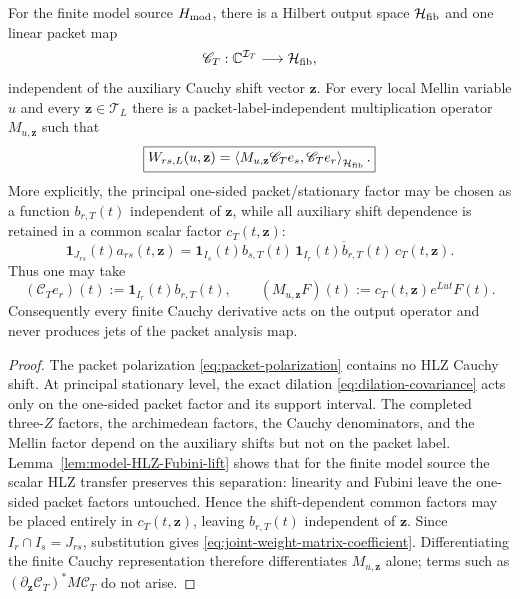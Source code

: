 \begin{lemma}
\label{lem:joint-weight-common-factor}
For the finite model source $H_{\rm mod}$, there is a Hilbert output space
$\mathcal H_{\rm fib}$ and one linear packet map
\[
\mathscr C_T:\mathbb C^{\mathcal I_T}\longrightarrow\mathcal H_{\rm fib},
\]
independent of the auxiliary Cauchy shift vector $\mathbf z$.  For every local
Mellin variable $u$ and every $\mathbf z\in\mathcal T_L$ there is a
packet-label-independent multiplication operator $M_{u,\mathbf z}$ such that
\begin{equation}
\boxed{
W_{rs,L}(u,\mathbf z)
=\left\langle
M_{u,\mathbf z}\mathscr C_Te_s,
\mathscr C_Te_r
\right\rangle_{\mathcal H_{\rm fib}}.
}
\label{eq:joint-weight-matrix-coefficient}
\end{equation}
More explicitly, the principal one-sided packet/stationary factor may be chosen
as a function $b_{r,T}(t)$ independent of $\mathbf z$, while all auxiliary
shift dependence is retained in a common scalar factor $c_T(t,\mathbf z)$:
\[
\mathbf 1_{J_{rs}}(t)a_{rs}(t,\mathbf z)
=
\mathbf 1_{I_s}(t)b_{s,T}(t)\,
\overline{\mathbf 1_{I_r}(t)b_{r,T}(t)}\,
c_T(t,\mathbf z).
\]
Thus one may take
\[
(\mathscr C_Te_r)(t):=\mathbf 1_{I_r}(t)b_{r,T}(t),
\qquad
(M_{u,\mathbf z}F)(t):=c_T(t,\mathbf z)e^{Lut}F(t).
\]
Consequently every finite Cauchy derivative acts on the output operator and
never produces jets of the packet analysis map.
\end{lemma}

\begin{proof}
The packet polarization \eqref{eq:packet-polarization} contains no HLZ Cauchy
shift.  At principal stationary level, the exact dilation
\eqref{eq:dilation-covariance} acts only on the one-sided packet factor and its
support interval.  The completed three-$Z$ factors, the archimedean factors,
the Cauchy denominators, and the Mellin factor depend on the auxiliary shifts
but not on the packet label. Lemma~\ref{lem:model-HLZ-Fubini-lift} shows that
for the finite model source the scalar HLZ transfer preserves this separation:
linearity and Fubini leave the one-sided packet factors untouched. Hence the
shift-dependent common factors may be placed entirely in $c_T(t,\mathbf z)$,
leaving $b_{r,T}(t)$ independent of $\mathbf z$.  Since
$I_r\cap I_s=J_{rs}$, substitution gives
\eqref{eq:joint-weight-matrix-coefficient}.  Differentiating the finite Cauchy
representation therefore differentiates $M_{u,\mathbf z}$ alone; terms such as
$(\partial_{\mathbf z}\mathscr C_T)^*M\mathscr C_T$ do not arise.
\end{proof}

